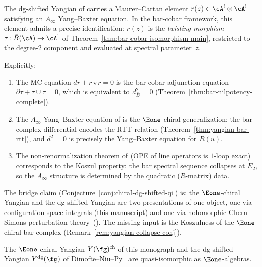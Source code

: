 \begin{remark}
\label{rem:dnp-mc-twisting}
The dg-shifted Yangian of \cite{DNP25} carries a
Maurer--Cartan element $r(z) \in \cA^! \otimes \cA^!$
satisfying an $A_\infty$ Yang--Baxter equation.
In the bar-cobar framework, this element admits a precise
identification: $r(z)$ is the \emph{twisting morphism}
$\tau\colon \bar{B}(\cA) \to \cA^!$
of Theorem~\ref{thm:bar-cobar-isomorphism-main},
restricted to the degree-$2$ component and evaluated at
spectral parameter~$z$.

Explicitly:
\begin{enumerate}[label=\textup{(\roman*)}]
\item The MC equation $dr + r \star r = 0$ is the
  bar-cobar adjunction equation
  $\partial \tau + \tau \cup \tau = 0$,
  which is equivalent to $d_{\bar{B}}^2 = 0$
  (Theorem~\ref{thm:bar-nilpotency-complete}).
\item The $A_\infty$ Yang--Baxter equation of
  \cite[\S5]{DNP25} is the $\Eone$-chiral generalization:
  the bar complex differential encodes the RTT relation
  (Theorem~\ref{thm:yangian-bar-rtt}), and $d^2 = 0$
  is precisely the Yang--Baxter equation for $R(u)$.
\item The non-renormalization theorem of \cite[Thm.~4.1]{DNP25}
  (OPE of line operators is $1$-loop exact) corresponds to
  the Koszul property: the bar spectral sequence collapses
  at $E_2$, so the $A_\infty$ structure is determined by
  the quadratic ($R$-matrix) data.
\end{enumerate}

The bridge claim (Conjecture~\ref{conj:chiral-dg-shifted-qi}) is:
the $\Eone$-chiral Yangian and the dg-shifted Yangian are two
presentations of one object, one via configuration-space
integrals (this manuscript) and one via holomorphic
Chern--Simons perturbation theory~(\cite{DNP25}).  The missing
input is the Koszulness of the $\Eone$-chiral bar complex
(Remark~\ref{rem:yangian-collapse-conj}).
\end{remark}

\begin{conjecture}\label{conj:chiral-dg-shifted-qi}
The $\Eone$-chiral Yangian $Y(\fg)^{\mathrm{ch}}$ of this monograph and the
dg-shifted Yangian $Y^{\mathrm{dg}}(\fg)$ of Dimofte--Niu--Py~\cite{DNP25}
are quasi-isomorphic as $\Eone$-algebras.
\end{conjecture}

